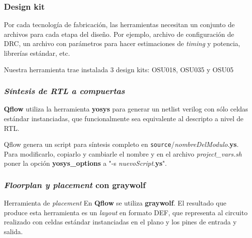 \documentclass{beamer}
\begin{document}
\begin{frame}
\frametitle{Design kit}
Por cada tecnología de fabricación, las herramientas necesitan un conjunto de archivos para cada etapa del diseño. Por ejemplo, archivo de configuración de DRC, un archivo con parámetros para hacer estimaciones de  \emph{timing} y potencia, librerías estándar, etc.

Nuestra herramienta trae instalada 3 design kits: OSU018, OSU035 y OSU05


\end{frame}
\begin{frame}[fragile]
  \frametitle{\emph{Síntesis de RTL a compuertas}}
  \textbf{Qflow} utiliza la herramienta \textbf{yosys} para generar un netlist verilog con sólo celdas estándar instanciadas, que funcionalmente sea equivalente al descripto a nivel de RTL.

  Qflow genera un script para síntesis completo en \verb.source./\emph{nombreDelModulo}.\textbf{ys}. Para modificarlo, copiarlo y cambiarle el nombre y en el archivo \emph{project\_vars.sh} poner la opción \textbf{yosys\_options} a "-s \emph{nuevoScript}.\textbf{ys}".

 
\end{frame}

\begin{frame}[fragile]
  \frametitle{\emph{Floorplan y placement} con \textbf{graywolf}}
  \begin{exampleblock}{Herramienta de \emph{placement}}
    En \textbf{Qflow} se utiliza \textbf{graywolf}. El resultado que produce esta herramienta es un \emph{layout} en formato DEF, que representa al circuito realizado con celdas estándar instanciadas en el plano y los pines de entrada y salida.
  \end{exampleblock}
\end{frame}
\end{document}
